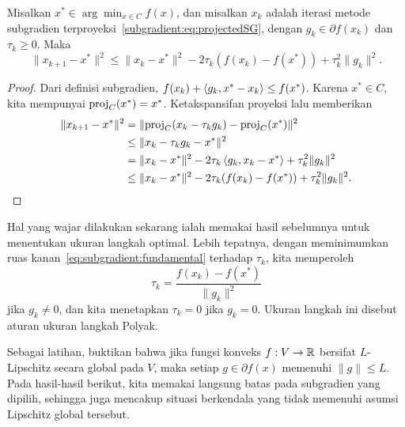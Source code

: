 \begin{lemma}\label{lemma:subgradient:fundamental}
    Misalkan \(x^*\in\arg\min_{x\in C}f(x)\), dan misalkan \(x_k\) adalah iterasi metode subgradien terproyeksi~\eqref{subgradient:eq:projectedSG}, dengan \(g_k\in\partial f(x_k)\) dan \(\tau_k\geq0\). Maka
    \begin{equation}
        \|x_{k+1}-x^*\|^2
        \leq \|x_k- x^*\|^2 - 2\tau_k (f(x_k)-f(x^*)) + \tau_k^2\|g_k\|^2.
    \end{equation}
\end{lemma}
\begin{proof}
    Dari definisi subgradien,
    \(f(x_k)+ \left\langle g_k , x^*-x_k\right\rangle\leq f(x^*)\). Karena \(x^*\in C\), kita mempunyai \(\mathrm{proj}_C(x^*)=x^*\). Ketakspansifan proyeksi lalu memberikan
    \begin{equation}\label{eq:subgradient:fundamental}
        \begin{aligned}
            \|x_{k+1}-x^*\|^2
            &= \|\mathrm{proj}_C(x_k-\tau_kg_k) - \mathrm{proj}_C(x^*)\|^2\\
            &\leq \|x_k-\tau_k g_k - x^*\|^2\\
            &= \|x_k- x^*\|^2 - 2\tau_k \left\langle g_k , x_k-x^*\right\rangle + \tau_k^2\|g_k\|^2\\
            &\leq \|x_k- x^*\|^2 - 2\tau_k (f(x_k)-f(x^*)) + \tau_k^2\|g_k\|^2.
        \end{aligned}
    \end{equation}
\end{proof}

Hal yang wajar dilakukan sekarang ialah memakai hasil sebelumnya untuk menentukan ukuran langkah optimal. Lebih tepatnya, dengan meminimumkan ruas kanan~\eqref{eq:subgradient:fundamental} terhadap \(\tau_k\), kita memperoleh
\begin{equation}
    \tau_k = \frac{f(x_k)-f(x^*)}{\|g_k\|^2}
\end{equation}
jika \(g_k\neq 0\), dan kita menetapkan \(\tau_k=0\) jika \(g_k=0\). Ukuran langkah ini disebut aturan ukuran langkah Polyak.

Sebagai latihan, buktikan bahwa jika fungsi konveks \(f:V\rightarrow\mathbb{R}\) bersifat \(L\)-Lipschitz secara global pada \(V\), maka setiap \(g\in\partial f(x)\) memenuhi \(\|g\|\leq L\). Pada hasil-hasil berikut, kita memakai langsung batas pada subgradien yang dipilih, sehingga juga mencakup situasi berkendala yang tidak memenuhi asumsi Lipschitz global tersebut.

